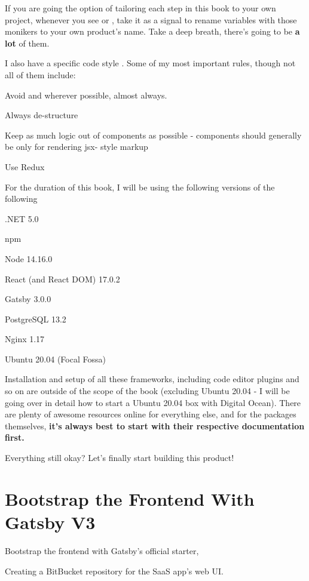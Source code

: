 \documentclass[a4paper,
                             oneside,
                             BCOR1.0cm,
                             DIV11,
                             parskip=full,
                             11pt]{scrbook}
\begin{document}
If you are going the option of tailoring each step in this book to your own project, whenever you see  or , take it as a signal to rename variables with those monikers to your own product's name. Take a deep breath, there's going to be \textbf{a lot} of them.


I also have a specific code style . Some of my most important rules, though not all of them include:

\begin{arrows}
\item Avoid  and  wherever possible, almost always.
\item Always de-structure 
\item Keep as much logic out of components as possible - components should generally be only for rendering jsx- style markup
\item Use Redux
\end{arrows}


For the duration of this book, I will be using the following versions of the following

\begin{arrows}
\item .NET 5.0
\item npm 
\item Node 14.16.0
\item React (and React DOM) 17.0.2
\item Gatsby 3.0.0
\item PostgreSQL 13.2
\item Nginx 1.17
\item Ubuntu 20.04 (Focal Fossa)
\end{arrows}

Installation and setup of all these frameworks, including code editor plugins and so on are outside of the scope of the book (excluding Ubuntu 20.04 - I will be going over in detail how to start a Ubuntu 20.04 box with Digital Ocean). There are plenty of awesome resources online for everything else, and for the packages themselves, \textbf{it's always best to start with their respective documentation first.}


Everything still okay? Let's finally start building this product!

\section{Bootstrap the Frontend With Gatsby V3}\label{sec:titles}
\begin{arrows}
\item Bootstrap the frontend with Gatsby's official starter, 
\item Creating a BitBucket  repository for the SaaS app's web UI.
\end{arrows}
\end{document}
